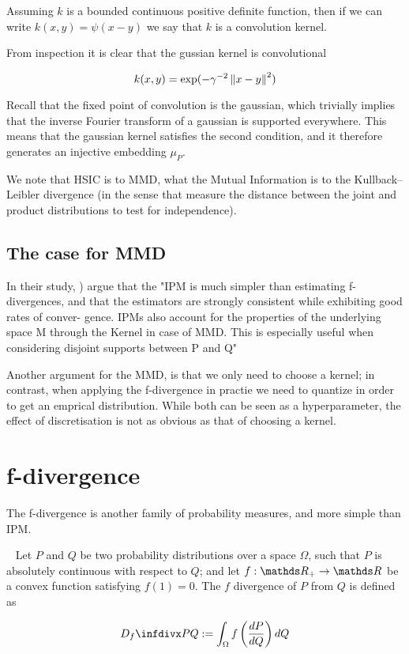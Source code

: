 Assuming $k$ is a bounded continuous positive definite function, then if we can write
$k(x, y) = \psi (x - y)$ we say that $k$ is a convolution kernel.

From inspection it is clear that the gussian kernel is convolutional

$$
    k(x, y) = \exp (-\gamma^{-2}\left\lVert x - y\right\rVert^2)
$$

Recall that the fixed point of convolution is the gaussian, which trivially implies
that the inverse Fourier transform of a gaussian is supported everywhere. 
 This means that the gaussian kernel satisfies the second
condition, and it therefore generates an injective embedding $\mu_P$.

We note that HSIC is to MMD, what the Mutual Information is to the Kullback–Leibler divergence (in the 
sense that measure the distance between the joint and product distributions to test for independence).

\subsection{The case for MMD}

In their study, \cite{sriperumbudur2009integral}) argue that the "IPM is much
simpler than estimating f-divergences, and that the estimators
are strongly consistent while exhibiting good rates of conver-
gence. IPMs also account for the properties of
the underlying space M through the Kernel in case of MMD. This is especially
useful when considering disjoint supports between P and Q"

Another argument for the MMD, is that we only need to choose a kernel; in contrast, 
when applying the f-divergence in practie we need to quantize in order to get an 
emprical distribution. While both can be seen as a hyperparameter, the effect of 
discretisation is not as obvious as that of choosing a kernel. 

\section{f-divergence}

The f-divergence is another family of probability measures, and more simple than IPM.

\begin{definition}[f-divergence]
    ~
Let $P$ and $Q$ be two probability distributions over a space $\Omega$, 
such that $P$ is absolutely continuous with respect to $Q$; and let 
$f: \R_+ \rightarrow \R$ be a convex function satisfying $f(1) = 0$. The $f$ divergence of 
$P$ from $Q$ is defined as

$$
    \infdiv{P}{Q} := \int_\Omega f \left( \frac{dP}{dQ} \right) dQ
$$
    
\end{definition}


